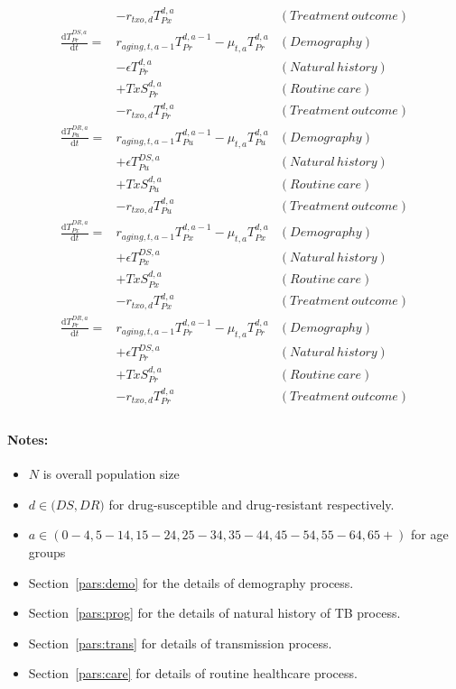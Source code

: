 \begin{align*}
  &- r_{txo, d} T_{Px}^{d, a} & (Treatment\,outcome)\\
\frac{\mathrm{d}T_{Pr}^{DS, a}}{\mathrm{d}t} =& r_{aging, t, a-1} T_{Pr}^{d, a - 1} - \mu_{t, a} T_{Pr}^{d, a} & (Demography)\\
  &- \epsilon T_{Pr}^{d, a} & (Natural\,history)\\
  &+ TxS_{Pr}^{d, a} & (Routine\,care)\\
  &- r_{txo, d} T_{Pr}^{d, a} & (Treatment\,outcome)\\
\frac{\mathrm{d}T_{Pu}^{DR, a}}{\mathrm{d}t} =& r_{aging, t, a-1} T_{Pu}^{d, a - 1} - \mu_{t, a} T_{Pu}^{d, a} & (Demography)\\
  &+ \epsilon T_{Pu}^{DS, a} & (Natural\,history)\\
  &+ TxS_{Pu}^{d, a} & (Routine\,care)\\
  &- r_{txo, d} T_{Pu}^{d, a} & (Treatment\,outcome)\\
\frac{\mathrm{d}T_{Px}^{DR, a}}{\mathrm{d}t} =& r_{aging, t, a-1} T_{Px}^{d, a - 1} - \mu_{t, a} T_{Px}^{d, a} & (Demography)\\
  &+ \epsilon T_{Px}^{DS, a} & (Natural\,history)\\
  &+ TxS_{Px}^{d, a} & (Routine\,care)\\
  &- r_{txo, d} T_{Px}^{d, a} & (Treatment\,outcome)\\
\frac{\mathrm{d}T_{Pr}^{DR, a}}{\mathrm{d}t} =& r_{aging, t, a-1} T_{Pr}^{d, a - 1} - \mu_{t, a} T_{Pr}^{d, a} & (Demography)\\
  &+ \epsilon T_{Pr}^{DS, a} & (Natural\,history)\\
  &+ TxS_{Pr}^{d, a} & (Routine\,care)\\
  &- r_{txo, d} T_{Pr}^{d, a} & (Treatment\,outcome)\\
\end{align*}


\paragraph{Notes:}
\begin{itemize}
    \item $N$ is overall population size 
    \item $d \in \big(DS, DR \big)$ for drug-susceptible and drug-resistant respectively.
    \item $a \in (0-4, 5-14, 15-24, 25-34, 35-44, 45-54, 55-64, 65+)$ for age groups
    \item Section~\ref{pars:demo} for the details of demography process.
    \item Section~\ref{pars:prog} for the details of natural history of TB process.
    \item Section~\ref{pars:trans} for details of transmission process.
    \item Section~\ref{pars:care} for details of routine healthcare process.
\end{itemize}

